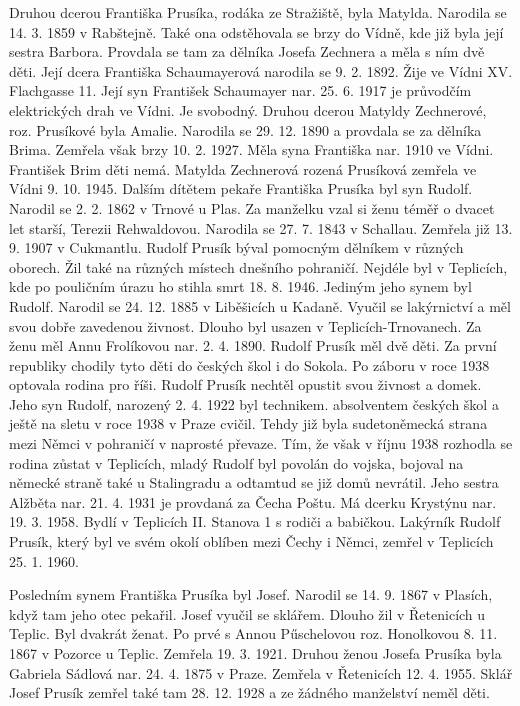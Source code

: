 \documentclass[../dejiny-rodu-prusiku.tex]{subfiles}
\begin{document}
Druhou dcerou Františka Prusíka, rodáka ze Stražiště, byla Matylda. Narodila se 14. 3. 1859 v Rabštejně. Také ona odstěhovala se brzy do Vídně, kde již byla její sestra Barbora. Provdala se tam za dělníka Josefa Zechnera a měla s ním dvě děti. Její dcera Františka Schaumayerová narodila se 9. 2. 1892. Žije ve Vídni XV. Flachgasse 11. Její syn František Schaumayer nar. 25. 6. 1917 je průvodčím elektrických drah ve Vídni. Je svobodný. Druhou dcerou Matyldy Zechnerové, roz. Prusíkové byla Amalie. Narodila se 29. 12. 1890 a provdala se za dělníka Brima. Zemřela však brzy 10. 2. 1927. Měla syna Františka nar. 1910 ve Vídni. František Brim děti nemá. Matylda Zechnerová rozená Prusíková zemřela ve Vídni 9. 10. 1945. Dalším dítětem pekaře Františka Prusíka byl syn Rudolf. Narodil se 2. 2. 1862 v Trnové u Plas. Za manželku vzal si ženu téměř o dvacet let starší, Terezii Rehwaldovou. Narodila se 27. 7. 1843 v Schallau. Zemřela již 13. 9. 1907 v Cukmantlu. Rudolf Prusík býval pomocným dělníkem v různých oborech. Žil také na různých místech dnešního pohraničí. Nejdéle byl v Teplicích, kde po pouličním úrazu ho stihla smrt 18. 8. 1946. Jediným jeho synem byl Rudolf. Narodil se 24. 12. 1885 v Liběšicích u Kadaně. Vyučil se lakýrnictví a měl svou dobře zavedenou živnost. Dlouho byl usazen v Teplicích-Trnovanech. Za ženu měl Annu Frolíkovou nar. 2. 4. 1890. Rudolf Prusík měl dvě děti. Za první republiky chodily tyto děti do českých škol i do Sokola. Po záboru v roce 1938 optovala rodina pro říši. Rudolf Prusík nechtěl opustit svou živnost a domek. Jeho syn Rudolf, narozený 2. 4. 1922 byl technikem. absolventem českých škol a ještě na sletu v roce 1938 v Praze cvičil. Tehdy již byla sudetoněmecká strana mezi Němci v pohraničí v naprosté převaze. Tím, že však v říjnu 1938 rozhodla se rodina zůstat v Teplicích, mladý Rudolf byl povolán do vojska, bojoval na německé straně také u Stalingradu a odtamtud se již domů nevrátil. Jeho sestra Alžběta nar. 21. 4. 1931 je prov­daná za Čecha Poštu. Má dcerku Krystýnu nar. 19. 3. 1958. Bydlí v Teplicích II. Stanova 1 s rodiči a babičkou. Lakýrník Rudolf Prusík, který byl ve svém okolí oblíben mezi Čechy i Němci, zemřel v Teplicích 25. 1. 1960.

Posledním synem Františka Prusíka byl Josef. Narodil se 14. 9. 1867 v Plasích, když tam jeho otec pekařil. Josef vyučil se sklářem. Dlouho žil v Řetenicích u Teplic. Byl dvakrát ženat. Po prvé s Annou Pűschelovou roz. Honolkovou 8. 11. 1867 v Pozorce u Teplic. Zemřela 19. 3. 1921. Druhou ženou Josefa Prusíka byla Gabriela Sádlová nar. 24. 4. 1875 v Praze. Zemřela v Řetenicích 12. 4. 1955. Sklář Josef Prusík zemřel také tam 28. 12. 1928 a ze žádného manželství neměl děti.
\end{document}
